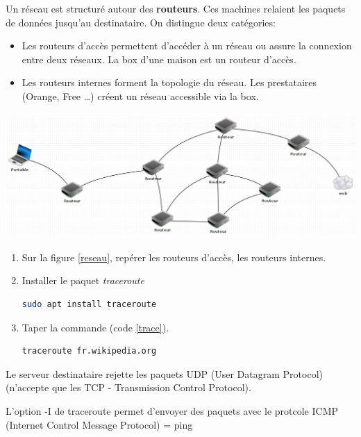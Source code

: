 \documentclass[a4paper,11pt]{article}
\begin{document}
Un réseau est structuré autour des \textbf{routeurs}. Ces machines relaient les paquets de données jusqu'au destinataire. On distingue deux catégories:
\begin{itemize}
    \item Les routeurs d'accès permettent d'accéder à un réseau ou assure la connexion entre deux réseaux. La box d'une maison est un routeur d'accès.
    \item Les routeurs internes forment la topologie du réseau. Les prestataires (Orange, Free \dots) créent un réseau accessible via la box. 
\end{itemize}
\begin{center}
    \centering
    \includegraphics[width=15cm]{ressources/reseau.png}
    \label{reseau}
\end{center}
\begin{activite}
\begin{enumerate}
    \item Sur la figure \ref{reseau}, repérer les routeurs d'accès, les routeurs internes.
    \item Installer le paquet \emph{traceroute}
    \begin{center}
        \begin{lstlisting}[language=bash]
sudo apt install traceroute
        \end{lstlisting}
        \label{ip}
    \end{center}
    \item Taper la commande (code \ref{trace}).
    \begin{center}
        \begin{lstlisting}[language=bash]
traceroute fr.wikipedia.org
        \end{lstlisting}
        \label{trace}
    \end{center}
\end{enumerate}
\end{activite}
\begin{commentprof}
Le serveur destinataire rejette les paquets UDP (User Datagram Protocol) (n'accepte que les TCP - Transmission Control Protocol).

L'option -I de traceroute permet d'envoyer des paquets avec le protcole ICMP (Internet Control Message Protocol) = ping
\end{commentprof}
\end{document}
